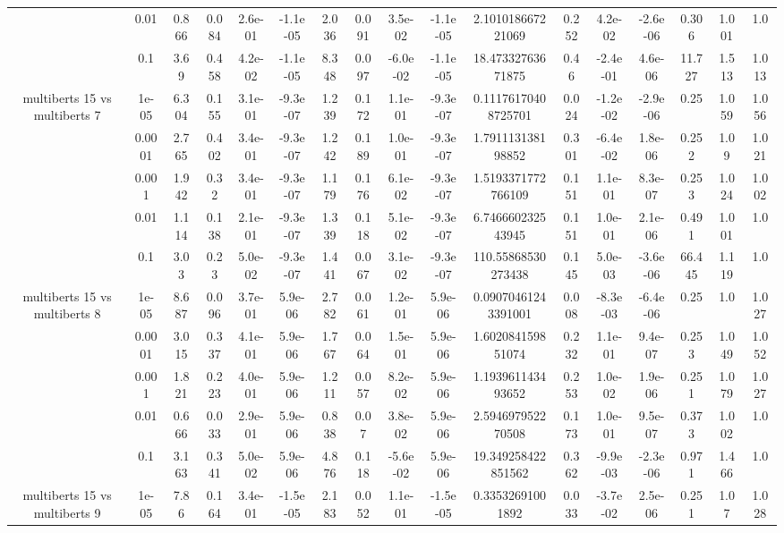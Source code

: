 \begin{tabular}{|c|c|c|c|c|c|c|c|c|c|c|c|c|c|c|c|c|}
 & 0.01 & 0.866 & 0.084 & 2.6e-01 & -1.1e-05 & 2.036 & 0.091 & 3.5e-02 & -1.1e-05 & 2.101018667221069 & 0.252 & 4.2e-02 & -2.6e-06 & 0.306 & 1.001 & 1.0 \\
 & 0.1 & 3.69 & 0.458 & 4.2e-02 & -1.1e-05 & 8.348 & 0.097 & -6.0e-02 & -1.1e-05 & 18.47332763671875 & 0.46 & -2.4e-01 & 4.6e-06 & 11.727 & 1.513 & 1.013 \\
\hline
\multirow{5}{*}{multiberts 15 vs multiberts 7} & 1e-05 & 6.304 & 0.155 & 3.1e-01 & -9.3e-07 & 1.239 & 0.172 & 1.1e-01 & -9.3e-07 & 0.11176170408725701 & 0.024 & -1.2e-02 & -2.9e-06 & 0.25 & 1.059 & 1.056 \\
 & 0.0001 & 2.765 & 0.402 & 3.4e-01 & -9.3e-07 & 1.242 & 0.189 & 1.0e-01 & -9.3e-07 & 1.791113138198852 & 0.301 & -6.4e-02 & 1.8e-06 & 0.252 & 1.09 & 1.021 \\
 & 0.001 & 1.942 & 0.32 & 3.4e-01 & -9.3e-07 & 1.179 & 0.176 & 6.1e-02 & -9.3e-07 & 1.5193371772766109 & 0.151 & 1.1e-01 & 8.3e-07 & 0.253 & 1.024 & 1.002 \\
 & 0.01 & 1.114 & 0.138 & 2.1e-01 & -9.3e-07 & 1.339 & 0.118 & 5.1e-02 & -9.3e-07 & 6.746660232543945 & 0.151 & 1.0e-01 & 2.1e-06 & 0.491 & 1.001 & 1.0 \\
 & 0.1 & 3.03 & 0.23 & 5.0e-02 & -9.3e-07 & 1.441 & 0.067 & 3.1e-02 & -9.3e-07 & 110.55868530273438 & 0.145 & 5.0e-03 & -3.6e-06 & 66.445 & 1.119 & 1.0 \\
\hline
\multirow{5}{*}{multiberts 15 vs multiberts 8} & 1e-05 & 8.687 & 0.096 & 3.7e-01 & 5.9e-06 & 2.782 & 0.061 & 1.2e-01 & 5.9e-06 & 0.09070461243391001 & 0.008 & -8.3e-03 & -6.4e-06 & 0.25 & 1.0 & 1.027 \\
 & 0.0001 & 3.015 & 0.337 & 4.1e-01 & 5.9e-06 & 1.767 & 0.064 & 1.5e-01 & 5.9e-06 & 1.602084159851074 & 0.232 & 1.1e-01 & 9.4e-07 & 0.253 & 1.049 & 1.052 \\
 & 0.001 & 1.821 & 0.223 & 4.0e-01 & 5.9e-06 & 1.211 & 0.057 & 8.2e-02 & 5.9e-06 & 1.193961143493652 & 0.253 & 1.0e-02 & 1.9e-06 & 0.251 & 1.079 & 1.027 \\
 & 0.01 & 0.666 & 0.033 & 2.9e-01 & 5.9e-06 & 0.838 & 0.07 & 3.8e-02 & 5.9e-06 & 2.594697952270508 & 0.173 & 1.0e-01 & 9.5e-07 & 0.373 & 1.002 & 1.0 \\
 & 0.1 & 3.163 & 0.341 & 5.0e-02 & 5.9e-06 & 4.876 & 0.118 & -5.6e-02 & 5.9e-06 & 19.349258422851562 & 0.362 & -9.9e-03 & -2.3e-06 & 0.971 & 1.466 & 1.0 \\
\hline
\multirow{5}{*}{multiberts 15 vs multiberts 9} & 1e-05 & 7.86 & 0.164 & 3.4e-01 & -1.5e-05 & 2.183 & 0.052 & 1.1e-01 & -1.5e-05 & 0.33532691001892 & 0.033 & -3.7e-02 & 2.5e-06 & 0.251 & 1.07 & 1.028 \\

\end{tabular}
